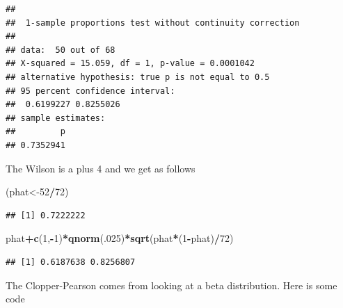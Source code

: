 \documentclass[]{book}
\newenvironment{Shaded}{\begin{snugshade}}{\end{snugshade}}
\newcommand{\KeywordTok}[1]{\textcolor[rgb]{0.13,0.29,0.53}{\textbf{#1}}}
\newcommand{\DecValTok}[1]{\textcolor[rgb]{0.00,0.00,0.81}{#1}}
\newcommand{\OperatorTok}[1]{\textcolor[rgb]{0.81,0.36,0.00}{\textbf{#1}}}
\newcommand{\NormalTok}[1]{#1}
\theoremstyle{definition}
\theoremstyle{definition}
\theoremstyle{definition}
\theoremstyle{remark}
\begin{document}
\begin{verbatim}
## 
##  1-sample proportions test without continuity correction
## 
## data:  50 out of 68
## X-squared = 15.059, df = 1, p-value = 0.0001042
## alternative hypothesis: true p is not equal to 0.5
## 95 percent confidence interval:
##  0.6199227 0.8255026
## sample estimates:
##         p 
## 0.7352941
\end{verbatim}

The Wilson is a plus 4 and we get as follows

\begin{Shaded}
\begin{Highlighting}[]
\NormalTok{(phat<-}\DecValTok{52}\OperatorTok{/}\DecValTok{72}\NormalTok{)}
\end{Highlighting}
\end{Shaded}

\begin{verbatim}
## [1] 0.7222222
\end{verbatim}

\begin{Shaded}
\begin{Highlighting}[]
\NormalTok{phat}\OperatorTok{+}\KeywordTok{c}\NormalTok{(}\DecValTok{1}\NormalTok{,}\OperatorTok{-}\DecValTok{1}\NormalTok{)}\OperatorTok{*}\KeywordTok{qnorm}\NormalTok{(.}\DecValTok{025}\NormalTok{)}\OperatorTok{*}\KeywordTok{sqrt}\NormalTok{(phat}\OperatorTok{*}\NormalTok{(}\DecValTok{1}\OperatorTok{-}\NormalTok{phat)}\OperatorTok{/}\DecValTok{72}\NormalTok{)}
\end{Highlighting}
\end{Shaded}

\begin{verbatim}
## [1] 0.6187638 0.8256807
\end{verbatim}

The Clopper-Pearson comes from looking at a beta distribution. Here is
some code
\end{document}
